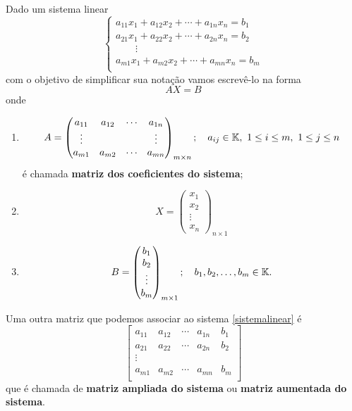 Dado um sistema linear
\begin{equation}
\begin{cases}
a_{11}x_1 + a_{12}x_2 + \cdots + a_{1n}x_n = b_1\\
a_{21}x_1 + a_{22}x_2 + \cdots + a_{2n}x_n = b_2\\
\qquad \vdots\\
a_{m1}x_1 + a_{m2}x_2 + \cdots + a_{mn}x_n = b_m\\
\end{cases}
\end{equation}
com o objetivo de simplificar sua nota\c{c}\~ao vamos escrev\^e-lo na forma
\begin{equation}\label{formamatricial}
AX = B
\end{equation}
onde
\begin{enumerate}
	\item
	\[
	A = \begin{pmatrix}
	a_{11} & a_{12} & \cdots & a_{1n}\\
	\vdots & & & \vdots\\
	a_{m1} & a_{m2} & \cdots & a_{mn}
	\end{pmatrix}_{m\times n}; \quad a_{ij} \in \cp{K},\ 1 \le i \le m,\ 1 \le j \le n
	\]
	\'e chamada \textbf{matriz dos coeficientes do sistema};
	\item
	\[
	X = \begin{pmatrix}
	x_1\\
	x_2\\
	\vdots\\
	x_n
	\end{pmatrix}_{n \times 1}
	\]
	\item
	\[
	B = \begin{pmatrix}
	b_1\\
	b_2\\
	\vdots\\
	b_m
	\end{pmatrix}_{m \times 1}; \quad b_1, b_2, \dots, b_m \in \mathbb{K}.
	\]
\end{enumerate}

Uma outra matriz que podemos associar ao sistema \eqref{sistemalinear} \'e
\[
\begin{bmatrix}
a_{11} & a_{12} & \cdots & a_{1n} & b_1\\
a_{21} & a_{22} & \cdots & a_{2n} & b_2\\
\vdots\\
a_{m1} & a_{m2} & \cdots & a_{mn} & b_m\\
\end{bmatrix}
\]
que \'e chamada de \textbf{matriz ampliada do sistema} ou \textbf{matriz aumentada do sistema}.

